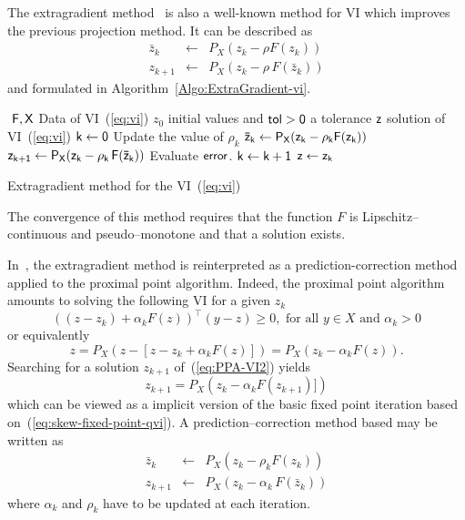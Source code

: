 The extragradient method~\citep{Korpelevich1976} is also a well-known method for VI which improves the previous projection method.  It can be described as
\begin{equation}
  \label{eq:vi-ge5}
  \begin{array}{lcl}
    \bar z_{k} &\leftarrow& P_X(z_k-\rho F(z_k))\\
    z_{k+1} &\leftarrow& P_X(z_{k}-\rho\,F(\bar z_k))
  \end{array}
\end{equation}
and formulated in Algorithm~\ref{Algo:ExtraGradient-vi}.
\begin{algorithm}
  \begin{algorithmic}
    {\sf
      \STATE $ $
      \REQUIRE $\sf F,X$ Data of VI~(\ref{eq:vi})
      \REQUIRE $z_0$ initial values and $\sf tol >0$ a tolerance
      \ENSURE  $\sf z$ solution of VI~(\ref{eq:vi})
      \STATE   $\sf k \leftarrow 0$ 
      \STATE Update the value of $\rho_k$
      \STATE $\sf \bar z_{k} \leftarrow P_X(z_{k}-\rho_k F(z_k))$
      \STATE $\sf z_{k+1} \leftarrow P_X(z_{k}-\rho_k\,F(\bar z_k))$
      \STATE Evaluate $\sf error$.
      \STATE $\sf k \leftarrow k+1$
      \ENDWHILE
      \STATE $\sf z \leftarrow z_{k}$ 
    }
  \end{algorithmic}
  \caption{Extragradient method for the VI~(\ref{eq:vi})}  \label{Algo:ExtraGradient-vi}
\end{algorithm}
The convergence of this method requires  that the function $F$ is Lipschitz--continuous and pseudo--monotone and that a solution exists. 

In~\citep{He.Liao_JOTA2002}, the extragradient method is reinterpreted as a prediction-correction method applied to the proximal point algorithm. Indeed, the proximal point algorithm amounts to solving the following VI for a given $z_k$
\begin{equation}
  \label{eq:PPA-VI1}
  ((z-z_k)+ \alpha_k F(z))^\top(y-z) \geq 0, \text{ for all } y \in X \text{ and } \alpha_k >0
\end{equation}
or equivalently
\begin{equation}
  \label{eq:PPA-VI2}
  z = P_{X}(z - [z - z_k + \alpha_k F(z)]) = P_{X}( z_k - \alpha_k F(z)).
\end{equation}
Searching for a solution $z_{k+1}$ of~(\ref{eq:PPA-VI2}) yields
\begin{equation}
  \label{eq:PPA-VI3}
  z_{k+1} = P_{X}( z_k - \alpha_k F(z_{k+1})])
\end{equation}
which can be viewed as a implicit version of the basic fixed point iteration based on~(\ref{eq:skew-fixed-point-qvi}). A prediction--correction method based may be written as 
\begin{equation}
  \label{eq:PPA-VI4}
  \begin{array}{lcl}
    \bar z_{k} &\leftarrow& P_X(z_k-\rho_k F(z_k))\\
    z_{k+1} &\leftarrow& P_X(z_{k}-\alpha_k\,F(\bar z_k))
  \end{array}
\end{equation}
where $\alpha_k$ and $\rho_k$ have to be updated at each iteration.

